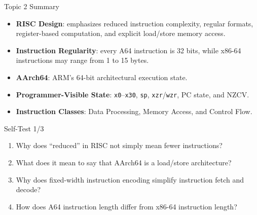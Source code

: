 \documentclass[aspectratio=169,11pt,t]{beamer}
\newcommand{\key}[1]{\textbf{#1}}
\newcommand{\code}[1]{\texttt{#1}}
\begin{document}
\begin{frame}{Topic 2 Summary}

\begin{itemize}
  \item \key{RISC Design}:
        emphasizes reduced instruction complexity,
        regular formats,
        register-based computation,
        and explicit load/store memory access.
  \item \key{Instruction Regularity}:
        every A64 instruction is 32 bits,
        while x86-64 instructions may range from
        1 to 15 bytes.
  \item \key{AArch64}:
        ARM's 64-bit architectural execution state.
  \item \key{Programmer-Visible State}:
        \code{x0}--\code{x30},
        \code{sp},
        \code{xzr}/\code{wzr},
        PC state,
        and NZCV.
  \item \key{Instruction Classes}:
        Data Processing,
        Memory Access,
        and Control Flow.
\end{itemize}

\end{frame}




\begin{frame}{Self-Test 1/3}

\begin{enumerate}
  \item Why does ``reduced''
        in RISC not simply mean
        fewer instructions?
  \item What does it mean
        to say that AArch64
        is a load/store architecture?
  \item Why does fixed-width instruction encoding
        simplify instruction fetch and decode?
  \item How does A64 instruction length
        differ from x86-64 instruction length?
\end{enumerate}

\end{frame}



\end{document}
